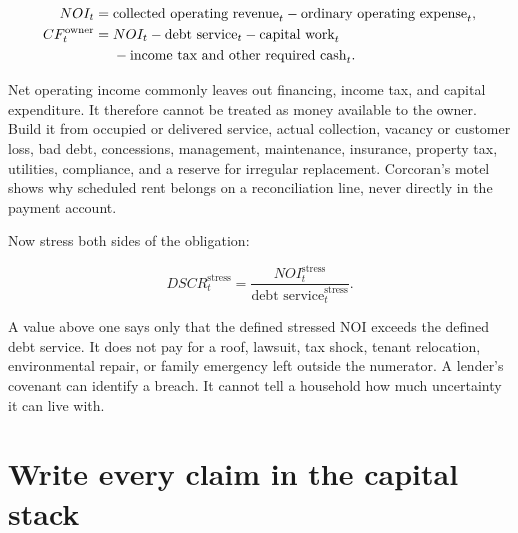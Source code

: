\begin{equation}
\ifdim\paperwidth<450pt
\begin{aligned}
NOI_t={}&\text{collected operating revenue}_t\\
        &-\text{ordinary operating expense}_t,\\
CF_t^{\mathrm{owner}}={}&NOI_t-\text{debt service}_t\\
        &-\text{capital work}_t-\text{income tax}_t\\
        &-\text{other required cash}_t.
\end{aligned}
\else
\begin{aligned}
NOI_t={}&\text{collected operating revenue}_t
          -\text{ordinary operating expense}_t,\\
CF_t^{\mathrm{owner}}={}&NOI_t-\text{debt service}_t
          -\text{capital work}_t\\
        &-\text{income tax and other required cash}_t.
\end{aligned}
\fi
\end{equation}

Net operating income commonly leaves out financing, income tax, and capital
expenditure. It therefore cannot be treated as money available to the owner.
Build it from occupied or delivered service, actual collection, vacancy or
customer loss, bad debt, concessions, management, maintenance, insurance,
property tax, utilities, compliance, and a reserve for irregular replacement.
Corcoran's motel shows why scheduled rent belongs on a reconciliation line,
never directly in the payment account.

Now stress both sides of the obligation:

\begin{equation}
DSCR_{t}^{\mathrm{stress}}
  =\frac{NOI_{t}^{\mathrm{stress}}}
         {\text{debt service}_{t}^{\mathrm{stress}}}.
\end{equation}

A value above one says only that the defined stressed NOI exceeds the defined
debt service. It does not pay for a roof, lawsuit, tax shock, tenant relocation,
environmental repair, or family emergency left outside the numerator. A
lender's covenant can identify a breach. It cannot tell a household how much
uncertainty it can live with.

\section{Write every claim in the capital stack}

